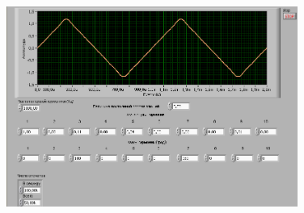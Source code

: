 \begin{figure}[H]
	\centering
	\includegraphics[width=0.85\textwidth]{pic/triangle.png}
	\caption{}
	
\end{figure}
